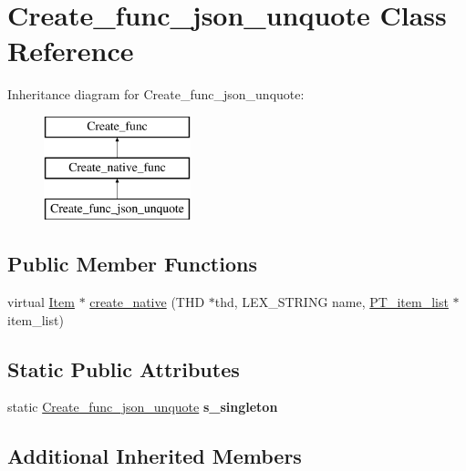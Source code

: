 \hypertarget{classCreate__func__json__unquote}{}\section{Create\+\_\+func\+\_\+json\+\_\+unquote Class Reference}
\label{classCreate__func__json__unquote}
Inheritance diagram for Create\+\_\+func\+\_\+json\+\_\+unquote\+:\begin{figure}[H]
\begin{center}
\leavevmode
\includegraphics[height=3.000000cm]{classCreate__func__json__unquote}
\end{center}
\end{figure}
\subsection*{Public Member Functions}
\begin{DoxyCompactItemize}
\item 
virtual \mbox{\hyperlink{classItem}{Item}} $\ast$ \mbox{\hyperlink{classCreate__func__json__unquote_af1136c2c462949f01e9550966aebfe20}{create\+\_\+native}} (T\+HD $\ast$thd, L\+E\+X\+\_\+\+S\+T\+R\+I\+NG name, \mbox{\hyperlink{classPT__item__list}{P\+T\+\_\+item\+\_\+list}} $\ast$item\+\_\+list)
\end{DoxyCompactItemize}
\subsection*{Static Public Attributes}
\begin{DoxyCompactItemize}
\item 
\mbox{\label{classCreate__func__json__unquote_a943d5c6371afbf00810beb11a67d98c0}} 
static \mbox{\hyperlink{classCreate__func__json__unquote}{Create\+\_\+func\+\_\+json\+\_\+unquote}} {\bfseries s\+\_\+singleton}
\end{DoxyCompactItemize}
\subsection*{Additional Inherited Members}


